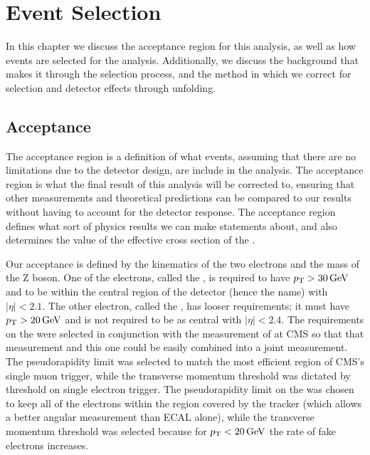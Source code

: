 \chapter{Event Selection}
\label{chapter:event_selection}

In this chapter we discuss the acceptance region for this analysis, as well as
how events are selected for the analysis. Additionally, we discuss the
background that makes it through the selection process, and the method in which
we correct for selection and detector effects through unfolding.

\section{Acceptance}
\label{sec:acceptance}

The acceptance region is a definition of what events, assuming that there are
no limitations due to the detector design, are include in the analysis. The
acceptance region is what the final result of this analysis will be corrected
to, ensuring that other measurements and theoretical predictions can be
compared to our results without having to account for the detector response.
The acceptance region defines what sort of physics results we can make
statements about, and also determines the value of the effective cross section
of the \Z.

Our acceptance is defined by the kinematics of the two electrons and the mass
of the Z boson. One of the electrons, called the \CentralElectron, is required
to have $p_{\mathrm{T}} > 30 \,\text{Ge\hspace{-.08em}V}$ and to be within the central region of the detector
(hence the name) with $|\eta| < 2.1$. The other electron, called the
\ExtendedElectron, has looser requirements; it must have $p_{\mathrm{T}} > 20 \,\text{Ge\hspace{-.08em}V}$ and is
not required to be as central with $|\eta| < 2.4$. The requirements on the
\CentralElectron were selected in conjunction with the \Ztomumu measurement of
\phistar at CMS so that that measurement and this one could be easily combined
into a joint measurement. The pseudorapidity limit was selected to match the
most efficient region of CMS's single muon trigger, while the transverse
momentum threshold was dictated by threshold on single electron trigger. The
pseudorapidity limit on the \ExtendedElectron was chosen to keep all of the
electrons within the region covered by the tracker (which allows a better
angular measurement than ECAL alone), while the transverse momentum threshold
was selected because for $p_{\mathrm{T}} < 20 \,\text{Ge\hspace{-.08em}V}$ the rate of fake electrons increases.

